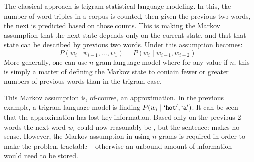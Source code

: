 \documentclass[parskip]{komatufte}
\begin{document}

  
The classical approach is trigram statistical language modeling.
In this, the number of word triples in a corpus is counted,
then given the previous two words, the next is predicted based on those counts.
This is making the Markov assumption that the next state depends only on the current state,
and that that state can be described by previous two words.
Under this assumption  becomes:
\begin{equation}\label{equ:trigramlangmodel}
P(w_i \mid w_{i-1}, \ldots, w_1) = P(w_i \mid w_{i-1}, w_{i-2})
\end{equation}
More generally, one can use $n$-gram language model where for any value if $n$,
this is simply a matter of defining the Markov state to contain fewer or greater numbers of previous words than in the trigram case.

This Markov assumption is, of-course, an approximation.
In the previous example, a trigram language model is finding $P(w_i \mid `\texttt{hot}', `\texttt{a}')$.
It can be seen that the approximation has lost key information.
Based only on the previous 2 words the next word $w_i$ could now reasonably be , but the sentence:  makes no sense.
However, the Markov assumption in using $n$-grams is required in order to make the problem tractable -- otherwise an unbound amount of information would need to be stored. 
\end{document}
